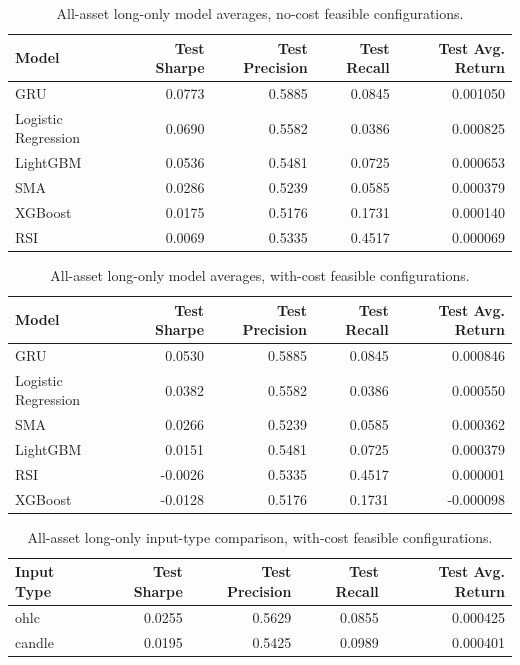 \documentclass[12pt]{article}
\begin{document}
\begin{table}[H]
\centering
\caption{All-asset long-only model averages, no-cost feasible configurations.}
\label{tab:appendix_table12_nocost}
\begingroup
\singlespacing
\begin{tabular}{lrrrr}
\toprule
Model & Test Sharpe & Test Precision & Test Recall & Test Avg. Return \\
\midrule
GRU & 0.0773 & 0.5885 & 0.0845 & 0.001050 \\
Logistic Regression & 0.0690 & 0.5582 & 0.0386 & 0.000825 \\
LightGBM & 0.0536 & 0.5481 & 0.0725 & 0.000653 \\
SMA & 0.0286 & 0.5239 & 0.0585 & 0.000379 \\
XGBoost & 0.0175 & 0.5176 & 0.1731 & 0.000140 \\
RSI & 0.0069 & 0.5335 & 0.4517 & 0.000069 \\
\bottomrule
\end{tabular}
\endgroup
\end{table}

\begin{table}[H]
\centering
\caption{All-asset long-only model averages, with-cost feasible configurations.}
\label{tab:appendix_table12_withcost}
\begingroup
\singlespacing
\begin{tabular}{lrrrr}
\toprule
Model & Test Sharpe & Test Precision & Test Recall & Test Avg. Return \\
\midrule
GRU & 0.0530 & 0.5885 & 0.0845 & 0.000846 \\
Logistic Regression & 0.0382 & 0.5582 & 0.0386 & 0.000550 \\
SMA & 0.0266 & 0.5239 & 0.0585 & 0.000362 \\
LightGBM & 0.0151 & 0.5481 & 0.0725 & 0.000379 \\
RSI & -0.0026 & 0.5335 & 0.4517 & 0.000001 \\
XGBoost & -0.0128 & 0.5176 & 0.1731 & -0.000098 \\
\bottomrule
\end{tabular}
\endgroup
\end{table}

\begin{table}[H]
\centering
\caption{All-asset long-only input-type comparison, with-cost feasible configurations.}
\label{tab:appendix_table10_withcost}
\begingroup
\singlespacing
\begin{tabular}{lrrrr}
\toprule
Input Type & Test Sharpe & Test Precision & Test Recall & Test Avg. Return \\
\midrule
ohlc & 0.0255 & 0.5629 & 0.0855 & 0.000425 \\
candle & 0.0195 & 0.5425 & 0.0989 & 0.000401 \\
\bottomrule
\end{tabular}
\endgroup
\end{table}
\end{document}

